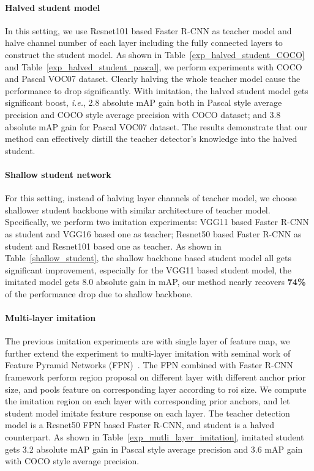\documentclass[10pt,twocolumn,letterpaper]{article}
\begin{document}
\paragraph{Halved student model}
In this setting, we use Resnet101 based Faster R-CNN as teacher model and halve channel number of each layer including the fully connected layers to construct the student model. As shown in Table~\ref{exp_halved_student_COCO} and Table~\ref{exp_halved_student_pascal}, we perform experiments with COCO and Pascal VOC07 dataset. Clearly halving the whole teacher model cause the performance to drop significantly. With imitation, the halved student model gets significant boost, \emph{i.e.}, 2.8 absolute mAP gain both in Pascal style average precision and COCO style average precision with COCO dataset; and 3.8 absolute mAP gain for Pascal VOC07 dataset. The results demonstrate that our method can effectively distill the teacher detector's knowledge into the halved student.



\vspace{-3mm}
\paragraph{Shallow student network}
For this setting, instead of halving layer channels of teacher model, we choose shallower student backbone with similar architecture of teacher model. Specifically, we perform two imitation experiments: VGG11 based Faster R-CNN as student and VGG16 based one as teacher;  Resnet50 based Faster R-CNN as student and Resnet101 based one as teacher. As shown in Table~\ref{shallow_student}, the shallow backbone based student model all gets significant improvement, especially for the VGG11 based student model, the imitated model gets 8.0 absolute gain in mAP, our method nearly recovers \textbf{74\%} of the performance drop due to shallow backbone.


\vspace{-3mm}
\paragraph{Multi-layer imitation}
The previous imitation experiments are with single layer of feature map, we further extend the experiment to multi-layer imitation with seminal work of Feature Pyramid Networks (FPN)~\cite{lin2017feature}. The FPN combined with Faster R-CNN framework perform region proposal on different layer with different anchor prior size, and pools feature on corresponding layer according to roi size. We compute the imitation region on each layer with corresponding prior anchors, and let student model imitate feature response on each layer. The teacher detection model is a Resnet50 FPN based Faster R-CNN, and student is a halved counterpart. As shown in Table~\ref{exp_mutli_layer_imitation}, imitated student gets 3.2 absolute mAP gain in Pascal style average precision and 3.6 mAP gain with COCO style average precision.
\end{document}
